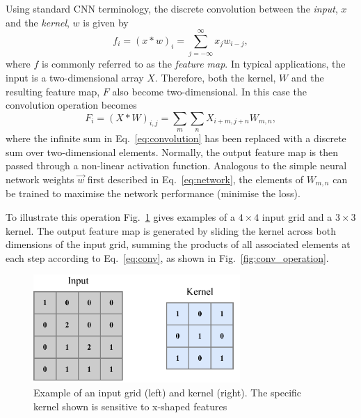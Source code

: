 Using standard CNN terminology, the discrete convolution between the \emph{input}, $x$ and the
\emph{kernel}, $w$ is given by
\begin{equation}
    f_{i}=(x*w)_{i}=\sum^{\infty}_{j=-\infty}x_{j}w_{i-j},
    \label{eq:convolution}
\end{equation}
where $f$ is commonly referred to as the \emph{feature map}. In typical applications, the input is
a two-dimensional array $X$. Therefore, both the kernel, $W$ and the resulting feature map, $F$
also become two-dimensional. In this case the convolution operation becomes
\begin{equation}
    F_{i}=(X*W)_{i,j}=\sum_{m}\sum_{n}X_{i+m,j+n}W_{m,n},
    \label{eq:conv}
\end{equation}
where the infinite sum in Eq.~\ref{eq:convolution} has been replaced with a discrete sum over
two-dimensional elements. Normally, the output feature map is then passed through a non-linear
activation function. Analogous to the simple neural network weights $\vec{w}$ first described in
Eq.~\ref{eq:network}, the elements of $W_{m,n}$ can be trained to maximise the network performance
(minimise the loss).

To illustrate this operation Fig.~\ref{fig:conv_input} gives examples of a $4 \times 4$ input grid
and a $3 \times 3$ kernel. The output feature map is generated by sliding the kernel across both
dimensions of the input grid, summing the products of all associated elements at each step
according to Eq.~\ref{eq:conv}, as shown in Fig.~\ref{fig:conv_operation}.

\begin{figure} %
    \includegraphics[width=0.7\textwidth]{diagrams/6-cnn/conv_input.pdf}
    \caption[Example of a Convolutional Neural Network input grid and kernel]
    {Example of an input grid (left) and kernel (right). The specific kernel shown is sensitive to
        x-shaped features}
    \label{fig:conv_input}
\end{figure}


